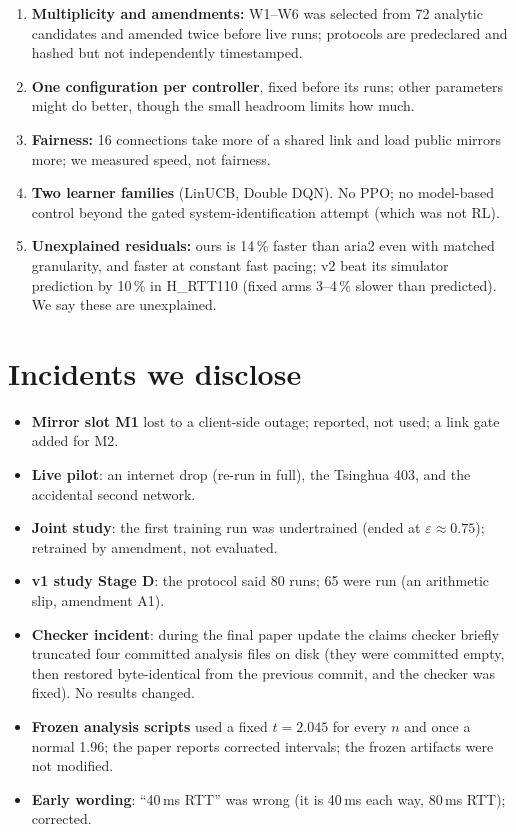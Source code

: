 \begin{enumerate}
\item \textbf{Multiplicity and amendments:} W1--W6 was selected from 72 analytic candidates and amended twice before live runs; protocols are predeclared and hashed but not independently timestamped.
\item \textbf{One configuration per controller}, fixed before its runs; other parameters might do better, though the small headroom limits how much.
\item \textbf{Fairness:} 16 connections take more of a shared link and load public mirrors more; we measured speed, not fairness.
\item \textbf{Two learner families} (LinUCB, Double DQN). No PPO; no model-based control beyond the gated system-identification attempt (which was not RL).
\item \textbf{Unexplained residuals:} ours is 14\,\% faster than aria2 even with matched granularity, and faster at constant fast pacing; v2 beat its simulator prediction by 10\,\% in H\_RTT110 (fixed arms 3--4\,\% slower than predicted). We say these are unexplained.
\end{enumerate}

\section{Incidents we disclose}
\begin{itemize}
\item \textbf{Mirror slot M1} lost to a client-side outage; reported, not used; a link gate added for M2.
\item \textbf{Live pilot}: an internet drop (re-run in full), the Tsinghua 403, and the accidental second network.
\item \textbf{Joint study}: the first training run was undertrained (ended at $\varepsilon\approx0.75$); retrained by amendment, not evaluated.
\item \textbf{v1 study Stage D}: the protocol said 80 runs; 65 were run (an arithmetic slip, amendment A1).
\item \textbf{Checker incident}: during the final paper update the claims checker briefly truncated four committed analysis files on disk (they were committed empty, then restored byte-identical from the previous commit, and the checker was fixed). No results changed.
\item \textbf{Frozen analysis scripts} used a fixed $t=2.045$ for every $n$ and once a normal 1.96; the paper reports corrected intervals; the frozen artifacts were not modified.
\item \textbf{Early wording}: ``40\,ms RTT'' was wrong (it is 40\,ms each way, 80\,ms RTT); corrected.
\end{itemize}
